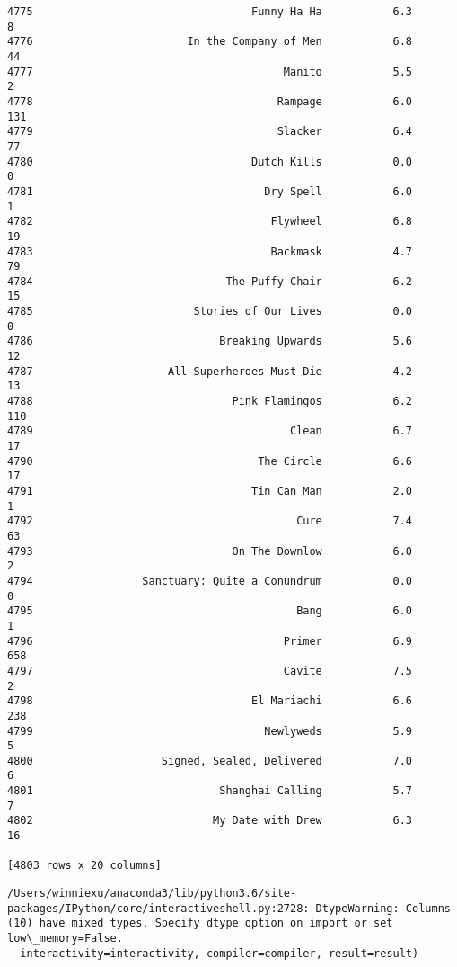 \documentclass[11pt]{article}
\begin{document}
\begin{Verbatim}[commandchars=\\\{\}]
4775                                  Funny Ha Ha           6.3           8  
4776                        In the Company of Men           6.8          44  
4777                                       Manito           5.5           2  
4778                                      Rampage           6.0         131  
4779                                      Slacker           6.4          77  
4780                                  Dutch Kills           0.0           0  
4781                                    Dry Spell           6.0           1  
4782                                     Flywheel           6.8          19  
4783                                     Backmask           4.7          79  
4784                              The Puffy Chair           6.2          15  
4785                         Stories of Our Lives           0.0           0  
4786                             Breaking Upwards           5.6          12  
4787                     All Superheroes Must Die           4.2          13  
4788                               Pink Flamingos           6.2         110  
4789                                        Clean           6.7          17  
4790                                   The Circle           6.6          17  
4791                                  Tin Can Man           2.0           1  
4792                                         Cure           7.4          63  
4793                               On The Downlow           6.0           2  
4794                 Sanctuary: Quite a Conundrum           0.0           0  
4795                                         Bang           6.0           1  
4796                                       Primer           6.9         658  
4797                                       Cavite           7.5           2  
4798                                  El Mariachi           6.6         238  
4799                                    Newlyweds           5.9           5  
4800                    Signed, Sealed, Delivered           7.0           6  
4801                             Shanghai Calling           5.7           7  
4802                            My Date with Drew           6.3          16  

[4803 rows x 20 columns]

    \end{Verbatim}

    \begin{Verbatim}[commandchars=\\\{\}]
/Users/winniexu/anaconda3/lib/python3.6/site-packages/IPython/core/interactiveshell.py:2728: DtypeWarning: Columns (10) have mixed types. Specify dtype option on import or set low\_memory=False.
  interactivity=interactivity, compiler=compiler, result=result)

    \end{Verbatim}
\end{document}
